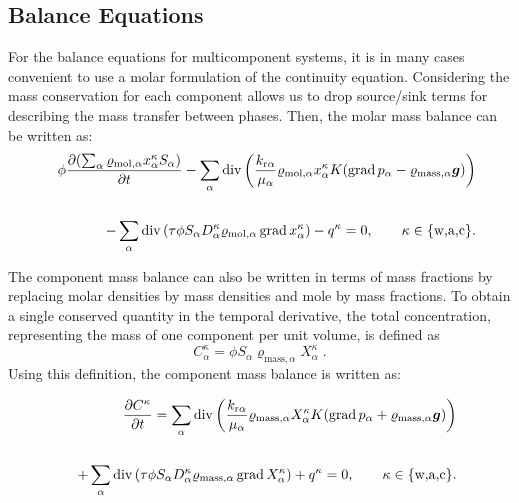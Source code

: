 \subsection{Balance Equations}
For the balance equations for multicomponent systems, it is in many
cases convenient to use a molar formulation of the continuity
equation. Considering the mass conservation for each component allows
us to drop source/sink terms for describing the mass transfer between
phases. Then, the
molar mass balance can be written as:
%
\begin{eqnarray}
  \label{A3:eqmass1}
  && \phi \frac{\partial (\sum_\alpha \varrho_{\text{mol}, \alpha}
    x_\alpha^\kappa S_\alpha )}{\partial t} \nonumber 
 - \sum\limits_\alpha \operatorname{div} \left( \frac{k_{\text{r}
        \alpha}}{\mu_\alpha} \varrho_{\text{mol}, \alpha}
    x_\alpha^\kappa K (\operatorname{grad} p_\alpha -
    \varrho_{\text{mass}, \alpha} \boldsymbol{g}) \right) \nonumber \\
  \nonumber \\
  && - \sum\limits_\alpha \operatorname{div} \left( \tau \phi S_\alpha D_\alpha^\kappa \varrho_{\text{mol},
      \alpha} \operatorname{grad} x_\alpha^\kappa \right) \nonumber 
 - q^\kappa = 0, \qquad \kappa \in \{\text{w,a,c}\}.
\end{eqnarray}

The component mass balance can also be written in terms of mass fractions 
by replacing molar densities by mass densities and mole by mass fractions.
To obtain a single conserved quantity in the temporal derivative, the total 
concentration, representing the mass of one component per unit volume, is defined as
\begin{displaymath}
C_\alpha^\kappa = \phi S_\alpha \varrho_{\text{mass},\alpha} X_\alpha^\kappa \; .
\end{displaymath}
Using this definition, the component mass balance is written as:

\begin{eqnarray}
  \label{A3:eqmass2}
  &&  \frac{\partial C^\kappa}{\partial t} = 
  \sum\limits_\alpha \operatorname{div} \left( \frac{k_{\text{r}
        \alpha}}{\mu_\alpha} \varrho_{\text{mass}, \alpha}
    X_\alpha^\kappa K (\operatorname{grad} p_\alpha +
    \varrho_{\text{mass}, \alpha} \boldsymbol{g}) \right) \nonumber \\
  \nonumber \\
  && + \sum\limits_\alpha \operatorname{div} \left( \tau \phi S_\alpha D_\alpha^\kappa \varrho_{\text{mass},
      \alpha} \operatorname{grad} X_\alpha^\kappa \right) \nonumber 
 + q^\kappa = 0, \qquad \kappa \in \{\text{w,a,c}\}.
\end{eqnarray}


